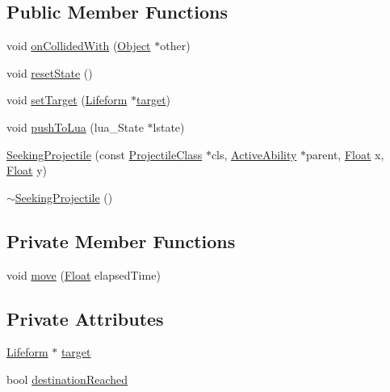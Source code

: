 \subsection*{Public Member Functions}
\begin{DoxyCompactItemize}
\item 
void \hyperlink{classZeta_1_1SeekingProjectile_afe1b12cde5fd78cd19e586088e225582}{on\+Collided\+With} (\hyperlink{classZeta_1_1Object}{Object} $\ast$other)
\item 
void \hyperlink{classZeta_1_1SeekingProjectile_a7e6d4a3cff7871bda6c656988a9c34ce}{reset\+State} ()
\item 
void \hyperlink{classZeta_1_1SeekingProjectile_a9487dc7fef7add664f3852fa1ec760d2}{set\+Target} (\hyperlink{classZeta_1_1Lifeform}{Lifeform} $\ast$\hyperlink{classZeta_1_1SeekingProjectile_af1f24a9e079f103da71f11383f93892a}{target})
\item 
void \hyperlink{classZeta_1_1SeekingProjectile_a5ddeabc562a342aca955a69eba498ec3}{push\+To\+Lua} (lua\+\_\+\+State $\ast$lstate)
\item 
\hyperlink{classZeta_1_1SeekingProjectile_a6eb875aeef6af8e485d5e5cb9beaf878}{Seeking\+Projectile} (const \hyperlink{classZeta_1_1ProjectileClass}{Projectile\+Class} $\ast$cls, \hyperlink{classZeta_1_1ActiveAbility}{Active\+Ability} $\ast$parent, \hyperlink{namespaceZeta_a1e0a1265f9b3bd3075fb0fabd39088ba}{Float} x, \hyperlink{namespaceZeta_a1e0a1265f9b3bd3075fb0fabd39088ba}{Float} y)
\item 
\hyperlink{classZeta_1_1SeekingProjectile_a3524c46fbcd95c16bef0669eeff7d226}{$\sim$\+Seeking\+Projectile} ()
\end{DoxyCompactItemize}
\subsection*{Private Member Functions}
\begin{DoxyCompactItemize}
\item 
void \hyperlink{classZeta_1_1SeekingProjectile_af9aa108d70ecbaa9290fb267f5e5337c}{move} (\hyperlink{namespaceZeta_a1e0a1265f9b3bd3075fb0fabd39088ba}{Float} elapsed\+Time)
\end{DoxyCompactItemize}
\subsection*{Private Attributes}
\begin{DoxyCompactItemize}
\item 
\hyperlink{classZeta_1_1Lifeform}{Lifeform} $\ast$ \hyperlink{classZeta_1_1SeekingProjectile_af1f24a9e079f103da71f11383f93892a}{target}
\item 
bool \hyperlink{classZeta_1_1SeekingProjectile_af08575fbf434bc405367c4a47180fe5f}{destination\+Reached}
\end{DoxyCompactItemize}
